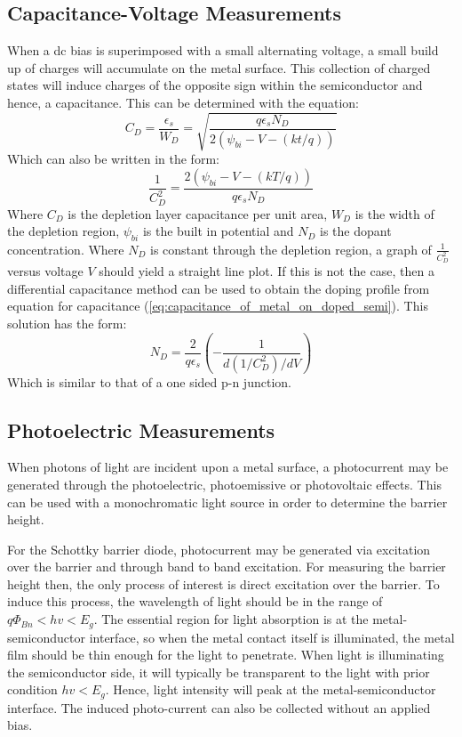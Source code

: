 \subsection{Capacitance-Voltage Measurements}
When a dc bias is superimposed with a small alternating voltage, a small build up of charges will accumulate on the metal surface. This collection of charged states will induce charges of the opposite sign within the semiconductor and hence, a capacitance. This can be determined with the equation:
\begin{equation}
	C_{D} = \frac{\epsilon_{s}}{W_{D}} = \sqrt{\frac{q\epsilon_{s}N_{D}}{2\left(\psi_{bi}-V-\left(kt/q\right)\right)}}
	\label{eq:capacitance_of_metal_on_doped_semi}
\end{equation}
Which can also be written in the form:
\begin{equation}
	\frac{1}{C^{2}_{D}} = \frac{2\left(\psi_{bi}-V-\left(kT/q\right)\right)}{q\epsilon_{s}N_{D}}
	\label{eq:1/capacitance^2_of_metal_on_doped_semi}
\end{equation}
Where $C_{D}$ is the depletion layer capacitance per unit area, $W_{D}$ is the width of the depletion region, $\psi_{bi}$ is the built in potential and $N_{D}$ is the dopant concentration. Where $N_{D}$ is constant through the depletion region, a graph of $\frac{1}{C^{2}_{D}}$ versus voltage $V$ should yield a straight line plot. If this is not the case, then a differential capacitance method can be used to obtain the doping profile from equation for capacitance (\ref{eq:capacitance_of_metal_on_doped_semi}). This solution has the form:
\begin{equation}
	N_{D} = \frac{2}{q\epsilon_{s}}\left(-\frac{1}{d\left(1/C^{2}_{D}\right)/dV}\right)
	\label{eq:ND_from_capacitance_measurements}
\end{equation}
Which is similar to that of a one sided p-n junction.

\subsection{Photoelectric Measurements}
When photons of light are incident upon a metal surface, a photocurrent may be generated through the photoelectric, photoemissive or photovoltaic effects. This can be used with a monochromatic light source in order to determine the barrier height.

For the Schottky barrier diode, photocurrent may be generated via excitation over the barrier and through band to band excitation. For measuring the barrier height then, the only process of interest is direct excitation over the barrier. To induce this process, the wavelength of light should be in the range of $q\Phi_{Bn} < hv < E_{g}$. The essential region for light absorption is at the metal-semiconductor interface, so when the metal contact itself is illuminated, the metal film should be thin enough for the light to penetrate. When light is illuminating the semiconductor side, it will typically be transparent to the light with prior condition $hv<E_{g}$. Hence, light intensity will peak at the metal-semiconductor interface. The induced photo-current can also be collected without an applied bias.

